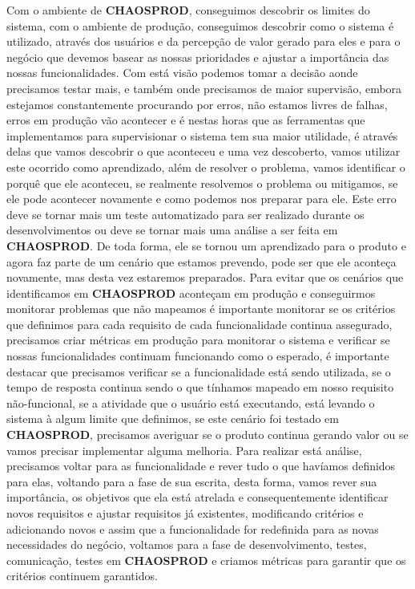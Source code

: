       Com o ambiente de \textbf{CHAOSPROD}, conseguimos descobrir os limites do
      sistema, com o ambiente de produção, conseguimos descobrir como o sistema é
      utilizado, através dos usuários e da percepção de valor gerado para eles
      e para o negócio que devemos basear as nossas prioridades e ajustar a
      importância das nossas funcionalidades. Com está visão podemos tomar a decisão
      aonde precisamos testar mais, e também onde precisamos de maior supervisão,
      embora estejamos constantemente procurando por erros, não estamos livres de
      falhas, erros em produção vão acontecer e é nestas horas que as ferramentas
      que implementamos para supervisionar o sistema tem sua maior utilidade, é
      através delas que vamos descobrir o que aconteceu e uma vez descoberto, vamos
      utilizar este ocorrido como aprendizado, além de resolver o problema, vamos
      identificar o porquê que ele aconteceu, se realmente resolvemos o problema ou
      mitigamos, se ele pode acontecer novamente e como podemos nos preparar para
      ele. Este erro deve se tornar mais um teste automatizado para ser realizado
      durante os desenvolvimentos ou deve se tornar mais uma análise a ser feita em
      \textbf{CHAOSPROD}. De toda forma, ele se tornou um aprendizado para o produto
      e agora faz parte de um cenário que estamos prevendo, pode ser que ele
      aconteça novamente, mas desta vez estaremos preparados. \newline
      Para evitar que os cenários que identificamos em \textbf{CHAOSPROD} aconteçam
      em produção e conseguirmos monitorar problemas que não mapeamos é importante
      monitorar se os critérios que definimos para cada requisito de cada funcionalidade
      continua assegurado, precisamos criar métricas em produção para monitorar
      o sistema e verificar se nossas funcionalidades continuam funcionando como o
      esperado, é importante destacar que precisamos verificar se a funcionalidade
      está sendo utilizada, se o tempo de resposta continua sendo o que tínhamos
      mapeado em nosso requisito não-funcional, se a atividade que o usuário está
      executando, está levando o sistema à algum limite que definimos, se este
      cenário foi testado em \textbf{CHAOSPROD}, precisamos averiguar se o
      produto continua gerando valor ou se vamos precisar implementar alguma
      melhoria. Para realizar está análise, precisamos voltar para as funcionalidade
      e rever tudo o que havíamos definidos para elas, voltando para a fase de
      sua escrita, desta forma, vamos rever sua importância, os objetivos que ela
      está atrelada e consequentemente identificar novos requisitos e ajustar
      requisitos já existentes, modificando critérios e adicionando novos e
      assim que a funcionalidade for redefinida para as novas necessidades do
      negócio, voltamos para a fase de desenvolvimento, testes, comunicação,
      testes em \textbf{CHAOSPROD} e criamos métricas para garantir que
      os critérios continuem garantidos.

